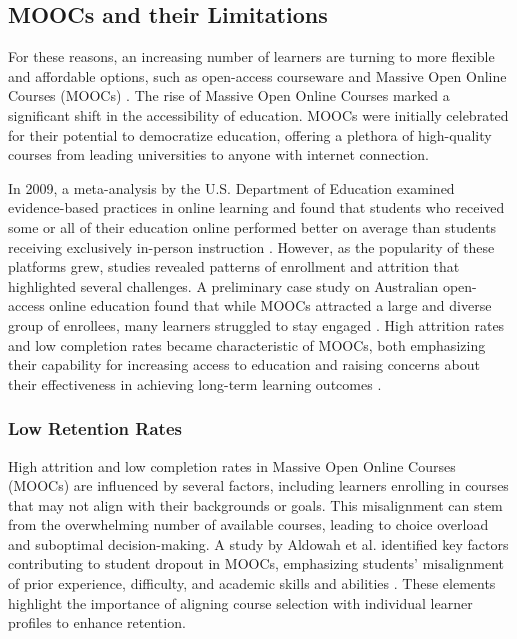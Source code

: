 \subsection{MOOCs and their Limitations}
For these reasons, an increasing number of learners are turning to more flexible and affordable options, such as open-access courseware and Massive Open Online Courses (MOOCs) \cite{harish_online_2013} \cite{pampouri_massive_2021}. The rise of Massive Open Online Courses marked a significant shift in the accessibility of education. MOOCs were initially celebrated for their potential to democratize education, offering a plethora of high-quality courses from leading universities to anyone with internet connection. 

In 2009, a meta-analysis by the U.S. Department of Education examined evidence-based practices in online learning and found that students who received some or all of their education online performed better on average than students receiving exclusively in-person instruction \cite{means_evaluation_2009}. However, as the popularity of these platforms grew, studies revealed patterns of enrollment and attrition that highlighted several challenges. A preliminary case study on Australian open-access online education found that while MOOCs attracted a large and diverse group of enrollees, many learners struggled to stay engaged \cite{greenland_patterns_2014}. High attrition rates and low completion rates became characteristic of MOOCs, both emphasizing their capability for increasing access to education and raising concerns about their effectiveness in achieving long-term learning outcomes \cite{clow_moocs_2013}. 

\subsubsection{Low Retention Rates}

High attrition and low completion rates in Massive Open Online Courses (MOOCs) are influenced by several factors, including learners enrolling in courses that may not align with their backgrounds or goals. This misalignment can stem from the overwhelming number of available courses, leading to choice overload and suboptimal decision-making. A study by Aldowah et al. identified key factors contributing to student dropout in MOOCs, emphasizing students’ misalignment of prior experience, difficulty, and academic skills and abilities \cite{noauthor_factors_nodate}. These elements highlight the importance of aligning course selection with individual learner profiles to enhance retention. 

